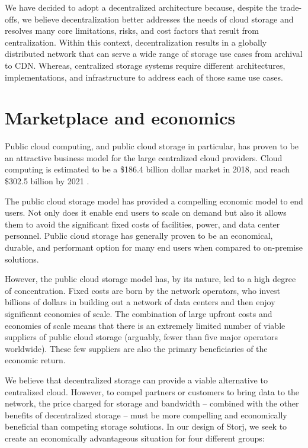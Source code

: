 \documentclass[8pt,fleqn,openany]{book}
\begin{document}
We have decided to adopt a decentralized architecture because, despite the trade-offs, we believe decentralization better addresses the needs of cloud storage
and resolves many core limitations, risks, and cost factors that result from
centralization. Within this context,
decentralization results in a globally distributed network that can
serve a wide range of storage use cases from archival to CDN. Whereas,
centralized storage systems require different architectures, implementations,
and infrastructure to address each of those same use cases.

\section{Marketplace and economics}

Public cloud computing, and public cloud storage in particular, has
proven to be an attractive business model for the large centralized cloud
providers. Cloud computing is estimated to be a \$186.4 billion dollar market
in 2018, and reach \$302.5 billion by 2021 \cite{gartner-cloud-growth}.

The public cloud storage model has provided a compelling economic model to end
users. Not only does it enable end users to scale on demand but also it allows them to avoid the significant fixed costs of facilities, power, and data center
personnel. Public cloud storage has generally proven to be an economical,
durable, and performant option for many end users when compared to
on-premise solutions.

However, the public cloud storage model has, by its nature, led to a high
degree of concentration. Fixed costs are born by the network operators, who
invest billions of dollars in building out a network of data centers and
then enjoy significant economies of scale. The combination of large upfront
costs and economies of scale means that there is an extremely limited number
of viable suppliers of public cloud storage (arguably, fewer than five major
operators worldwide). These few suppliers are also the primary beneficiaries of
the economic return.

We believe that decentralized storage can provide a viable alternative to
centralized cloud.
However, to compel partners or customers to bring data to the network,
the price charged for storage and bandwidth -- combined with the other
benefits of decentralized storage -- must be
more compelling and economically beneficial than competing storage solutions.
In our design of Storj, we seek to create an economically advantageous
situation for four different groups:
\end{document}
